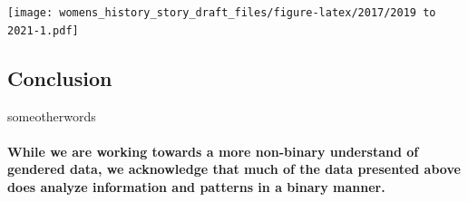 \documentclass[
  12pt,
]{article}
\begin{document}
\texttt{[image: womens\_history\_story\_draft\_files/figure-latex/2017/2019 to 2021-1.pdf]}

\newpage
\setlength{\headheight}{10pt}
\setlength{\textheight}{665pt}
\fancyhead[L]{}

\hypertarget{conclusion}{%
\subsection{Conclusion}\label{conclusion}}

\begin{flushleft}
someotherwords
\end{flushleft}

\hypertarget{while-we-are-working-towards-a-more-non-binary-understand-of-gendered-data-we-acknowledge-that-much-of-the-data-presented-above-does-analyze-information-and-patterns-in-a-binary-manner.}{%
\paragraph{While we are working towards a more non-binary understand of
gendered data, we acknowledge that much of the data presented above does
analyze information and patterns in a binary
manner.}\label{while-we-are-working-towards-a-more-non-binary-understand-of-gendered-data-we-acknowledge-that-much-of-the-data-presented-above-does-analyze-information-and-patterns-in-a-binary-manner.}}
\end{document}
